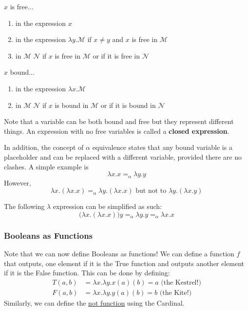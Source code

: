   \begin{definition}
    \label{def:free-variables-of-a-lambda-expression}
  $x$ is free...
  \begin{enumerate}
      \item in the expression $x$
      \item in the expression $\lambda y. \mathcal{M}$ if $x \neq y $ and $x$ is free in $\mathcal{M}$ 
      \item in $\mathcal{M}\; \mathcal{N}$ if $x$ is free in $\mathcal{M}$ or if it is free in $\mathcal{N}$ 
  \end{enumerate}
  $x$ bound...
  \begin{enumerate}
      \item in the expression $\lambda x. \mathcal{M}$
      \item in $\mathcal{M} \; \mathcal{N}$ if $x$ is bound in $\mathcal{M}$ or if it is bound in $\mathcal{N}$
  \end{enumerate}
  \end{definition}
  Note that a variable can be both bound and free but they represent different things. An expression with no free variables is called a \textbf{closed expression}. 

  In addition, the concept of $\alpha$ equivalence states that any bound variable is a placeholder and can be replaced with a different variable, provided there are no clashes. A simple example is
  \begin{equation}
    \lambda x . x =_\alpha \lambda y . y
  \end{equation}
  However, 
  \begin{equation}
    \lambda x. (\lambda x. x) =_\alpha \lambda y . (\lambda x .x) \text{ but not to } \lambda y. (\lambda x . y)
  \end{equation}

  \begin{example}
    \label{ex:simplifying-a-lambda-expression}
  The following $\lambda$ expression can be simplified as such: 
  \begin{equation}
    \big( \lambda x. (\lambda x. x) \big) y =_\alpha \lambda y . y =_\alpha \lambda x. x
  \end{equation}
  \end{example}

  \subsubsection{Booleans as Functions}
  Note that we can now define Booleans as functions! We can define a function $f$ that outputs, one element if it is the True function and outputs another element if it is the False function. This can be done by defining:
  \begin{align*}
      T(a, b) & = \lambda x . \lambda y . x (a) (b) = a \text{ (the Kestrel!)}\\
      F(a, b) & = \lambda x . \lambda y . y (a) (b) = b \text{ (the Kite!)}
  \end{align*}
  Similarly, we can define the \hyperref[def:not-function]{not function} using the Cardinal. 

